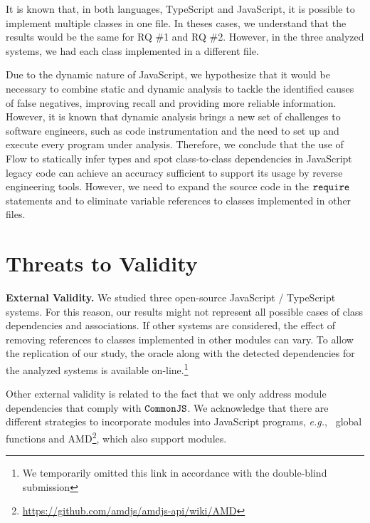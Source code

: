 \documentclass[review]{elsarticle}
\newcommand{\mcode}[1]{$\tt #1$}
\begin{document}
It is known that, in both languages, TypeScript and JavaScript, it is possible to implement multiple classes in one file. In theses cases, we understand that the results would be the same for RQ \#1 and RQ \#2. However, in the three analyzed systems, we had each class implemented in a different file.

Due to the dynamic nature of JavaScript, we hypothesize that it would be necessary to combine static and dynamic analysis to tackle the identified causes of false negatives, improving recall and providing more reliable information. However, it is known that dynamic analysis brings a new set of challenges to software engineers, such as code instrumentation and the need to set up and execute every program under analysis. Therefore, we conclude that the use of Flow to statically infer types and spot class-to-class dependencies in JavaScript legacy code can achieve an accuracy sufficient to support its usage by reverse engineering tools. However, we need to expand the source code in the \mcode{require} statements and to eliminate variable references to classes implemented in other files.



\section{Threats to Validity}
\label{sec:threats}

\noindent \textbf{External Validity.} We studied three open-source JavaScript / TypeScript systems. For this reason, our results might not represent all possible cases of class dependencies and associations. If other systems are considered, the effect of removing references to classes implemented in other modules can vary. To allow the replication of our study, the oracle along with the detected dependencies for the analyzed systems is available on-line.\footnote{We temporarily omitted this link in accordance with the double-blind submission}

Other external validity is related to the fact that we only address module dependencies that comply with \mcode{CommonJS}. We acknowledge that there are different strategies to incorporate modules into JavaScript programs, \emph{e.g.},~ global functions and AMD\footnote{\url{https://github.com/amdjs/amdjs-api/wiki/AMD}}, which also support modules.

\vspace{1.5 mm}
\end{document}

